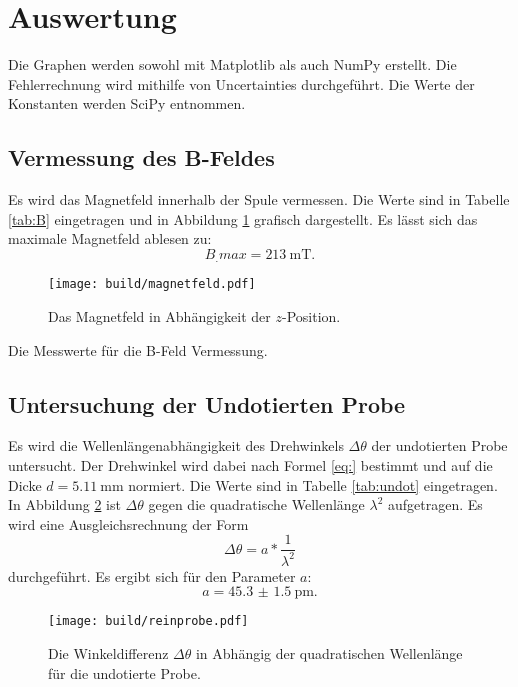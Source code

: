 \section{Auswertung}
\label{sec:Auswertung}

Die Graphen werden sowohl mit Matplotlib \cite{matplotlib} als auch NumPy \cite{numpy} erstellt. Die Fehlerrechnung wird mithilfe von Uncertainties \cite{uncertainties} durchgeführt. Die Werte der Konstanten werden SciPy \cite{scipy} entnommen.

\subsection{Vermessung des B-Feldes}
Es wird das Magnetfeld innerhalb der Spule vermessen. Die Werte sind in Tabelle \ref{tab:B} eingetragen und in Abbildung \ref{fig:B} grafisch dargestellt. Es lässt sich das maximale Magnetfeld ablesen zu:
\[
B_.{max}=\SI{213}{\milli\tesla}\text{.}
\]

\begin{figure}
	\centering
	\texttt{[image: build/magnetfeld.pdf]}
	\caption{Das Magnetfeld in Abhängigkeit der $z$-Position.}
	\label{fig:B}
\end{figure}

\begin{table}
	\centering
	\caption{Die Messwerte für die B-Feld Vermessung.}
	
	
	\label{tab:B}
\end{table}

\subsection{Untersuchung der Undotierten Probe}
Es wird die Wellenlängenabhängigkeit des Drehwinkels $\Delta\theta$ der undotierten Probe untersucht. Der Drehwinkel wird dabei nach Formel \eqref{eq:} bestimmt und auf die Dicke $d=\SI{5.11}{\milli\metre}$ normiert. Die Werte sind in Tabelle \ref{tab:undot} eingetragen. In Abbildung \ref{fig:undot} ist $\Delta\theta$ gegen die quadratische Wellenlänge $\lambda^2$ aufgetragen. Es wird eine Ausgleichsrechnung der Form 
\[
\Delta\theta = a*\frac{1}{\lambda^2} 
\]
durchgeführt. Es ergibt sich für den Parameter $a$:
\[
a = \SI{45.3(15)}{\pico\metre}\text{.}
\]
\begin{figure}
	\centering
	\texttt{[image: build/reinprobe.pdf]}
	\caption{Die Winkeldifferenz $\Delta\theta$ in Abhängig der quadratischen Wellenlänge für die undotierte Probe.}
	\label{fig:undot}
\end{figure}

